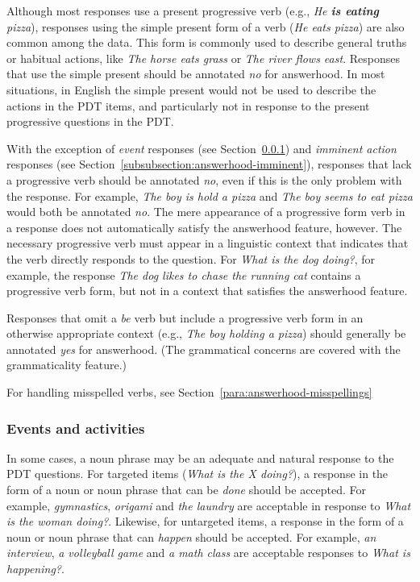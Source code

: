 \documentclass[12pt]{article}
\begin{document}
Although most responses use a present progressive verb (e.g., \textit{He \textbf{is eating} pizza}), responses using the simple present form of a verb (\textit{He eats pizza}) are also common among the data. This form is commonly used to describe general truths or habitual actions, like \textit{The horse eats grass} or \textit{The river flows east}. Responses that use the simple present should be annotated \textit{no} for answerhood. In most situations, in English the simple present would not be used to describe the actions in the PDT items, and particularly not in response to the present progressive questions in the PDT.

With the exception of \textit{event} responses (see Section~\ref{subsubsection:answerhood-events}) and \textit{imminent action} responses (see Section~\ref{subsubsection:answerhood-imminent}), responses that lack a progressive verb should be annotated \textit{no}, even if this is the only problem with the response. For example, \textit{The boy is hold a pizza} and \textit{The boy seems to eat pizza} would both be annotated \textit{no}. The mere appearance of a progressive form verb in a response does not automatically satisfy the answerhood feature, however. The necessary progressive verb must appear in a linguistic context that indicates that the verb directly responds to the question. For \textit{What is the dog doing?}, for example, the response \textit{The dog likes to chase the running cat} contains a progressive verb form, but not in a context that satisfies the answerhood feature.

Responses that omit a \textit{be} verb but include a progressive verb form in an otherwise appropriate context (e.g., \textit{The boy holding a pizza}) should generally be annotated \textit{yes} for answerhood. (The grammatical concerns are covered with the grammaticality feature.)

For handling misspelled verbs, see Section~\ref{para:answerhood-misspellings}

\subsubsection{Events and activities}
\label{subsubsection:answerhood-events} In some cases, a noun phrase may be an adequate and natural response to the PDT questions. For targeted items (\textit{What is the X doing?}), a response in the form of a noun or noun phrase that can be \textit{done} should be accepted. For example, \textit{gymnastics}, \textit{origami} and \textit{the laundry} are acceptable in response to \textit{What is the woman doing?}. Likewise, for untargeted items, a response in the form of a noun or noun phrase that can \textit{happen} should be accepted. For example, \textit{an interview}, \textit{a volleyball game} and \textit{a math class} are acceptable responses to \textit{What is happening?}.
\end{document}
